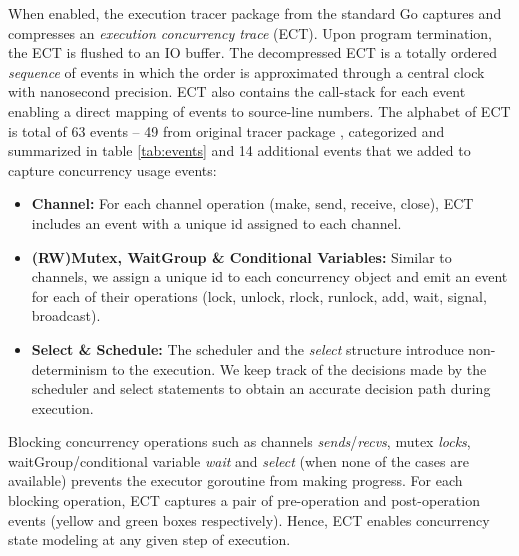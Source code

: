 When enabled, the execution tracer package from the standard Go captures and compresses an \textit{execution concurrency trace} (ECT).
%
Upon program termination, the ECT is flushed to an IO buffer.
%
The decompressed ECT is a totally ordered \textit{sequence} of events in which the order is approximated through a central clock with nanosecond precision.
%
ECT also contains the call-stack for each event enabling a direct mapping of events to source-line numbers.
%
The alphabet of ECT is total of 63 events -- 49 from original tracer package \cite{goParserSource}, categorized and summarized in table \ref{tab:events} and 14 additional events that we added to capture concurrency usage events:
%
\begin{itemize}
    \item \textbf{Channel:} For each channel operation (make, send, receive, close), ECT includes an event with a unique id assigned to each channel.
    \item \textbf{(RW)Mutex, WaitGroup \& Conditional Variables:} Similar to channels, we assign a unique id to each concurrency object and emit an event for each of their operations (lock, unlock, rlock, runlock, add, wait, signal, broadcast).
    \item \textbf{Select \& Schedule:} The scheduler and the \textit{select} structure introduce non-determinism to the execution. We keep track of the decisions made by the scheduler and select statements to obtain an accurate decision path during execution.
\end{itemize}

Blocking concurrency operations such as channels \textit{sends}/\textit{recvs}, mutex \textit{locks}, waitGroup/conditional variable \textit{wait} and \textit{select} (when none of the cases are available) prevents the executor goroutine from making progress.
%
For each blocking operation, ECT captures a pair of pre-operation and post-operation events (yellow and green boxes respectively).
%
Hence, ECT enables concurrency state modeling at any given step of execution.
%

